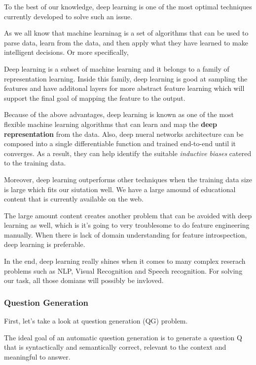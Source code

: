 \documentclass{acm_proc_article-sp}
\begin{document}
To the best of our knowledge, deep learning is one of the most optimal
techniques currently developed to solve such an issue.

As we all know that machine learninag is a set of algorithms that can be
used to parse data, learn from the data, and then apply what they have
learned to make intelligent decisions. Or more specifically,

Deep learning is a subset of machine learning and it belongs to a family
of representation learning. Inside this family, deep learning is good at
sampling the features and have additonal layers for more abstract
feature learning which will support the final goal of mapping the
feature to the output.

Because of the above advantages, deep learning is known as one of the
most flexible machine learning algorithms that can learn and map the
\textbf{deep representation} from the data. Also, deep nueral networks
architecture can be composed into a single differentiable function and
trained end-to-end until it converges. As a result, they can help
identify the suitable \emph{inductive} \emph{biases} catered to the
training data.

Moreover, deep learning outperforms other techniques when the training
data size is large which fits our siutation well. We have a large amound
of educational content that is currently available on the web.

The large amount content creates another problem that can be avoided
with deep learning as well, which is it's going to very troublesome to
do feature engineering manually. When there is lack of domain
understanding for feature introspection, deep learning is preferable.

In the end, deep learning really shines when it comes to many complex
reserach problems such as NLP, Visual Recognition and Speech
recognition. For solving our task, all those domians will possibly be
invloved.

\subsubsection{Question Generation}\label{question-generation}

First, let's take a look at question generation (QG) problem.

The ideal goal of an automatic question generation is to generate a
question Q that is syntactically and semantically correct, relevant to
the context and meaningful to answer.
\end{document}
